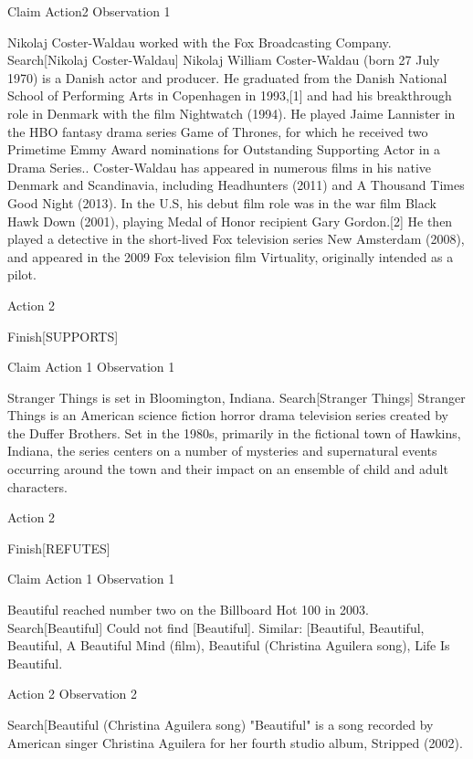 \documentclass[
]{article}
\begin{document}
Claim Action2 Observation 1

Nikolaj Coster-Waldau worked with the Fox Broadcasting Company.
Search{[}Nikolaj Coster-Waldau{]} Nikolaj William Coster-Waldau (born 27
July 1970) is a Danish actor and producer. He graduated from the Danish
National School of Performing Arts in Copenhagen in 1993,{[}1{]} and had
his breakthrough role in Denmark with the film Nightwatch (1994). He
played Jaime Lannister in the HBO fantasy drama series Game of Thrones,
for which he received two Primetime Emmy Award nominations for
Outstanding Supporting Actor in a Drama Series.. Coster-Waldau has
appeared in numerous films in his native Denmark and Scandinavia,
including Headhunters (2011) and A Thousand Times Good Night (2013). In
the U.S, his debut film role was in the war film Black Hawk Down (2001),
playing Medal of Honor recipient Gary Gordon.{[}2{]} He then played a
detective in the short-lived Fox television series New Amsterdam (2008),
and appeared in the 2009 Fox television film Virtuality, originally
intended as a pilot.

Action 2

Finish{[}SUPPORTS{]}

Claim Action 1 Observation 1

Stranger Things is set in Bloomington, Indiana. Search{[}Stranger
Things{]} Stranger Things is an American science fiction horror drama
television series created by the Duffer Brothers. Set in the 1980s,
primarily in the fictional town of Hawkins, Indiana, the series centers
on a number of mysteries and supernatural events occurring around the
town and their impact on an ensemble of child and adult characters.

Action 2

Finish{[}REFUTES{]}

Claim Action 1 Observation 1

Beautiful reached number two on the Billboard Hot 100 in 2003.
Search{[}Beautiful{]} Could not find {[}Beautiful{]}. Similar:
{[}\textquotesingle Beautiful\textquotesingle,
\textquotesingle Beautiful, Beautiful\textquotesingle,
\textquotesingle A Beautiful Mind (film)\textquotesingle,
\textquotesingle Beautiful (Christina Aguilera song)\textquotesingle,
\textquotesingle Life Is Beautiful\textquotesingle{]}.

Action 2 Observation 2

Search{[}Beautiful (Christina Aguilera song) "Beautiful" is a song
recorded by American singer Christina Aguilera for her fourth studio
album, Stripped (2002).
\end{document}
